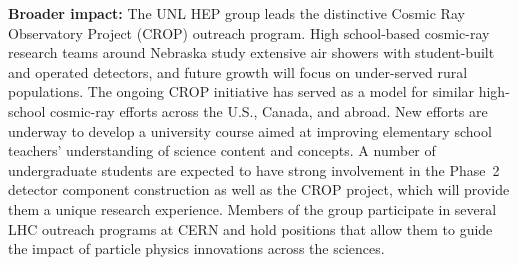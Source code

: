 \documentclass[11pt]{article}
\begin{document}
{\bf Broader impact:}
The UNL HEP group leads the distinctive Cosmic Ray
Observatory Project (CROP) outreach program.  High school-based cosmic-ray research teams around Nebraska study
extensive air showers with student-built and operated detectors, and future growth will focus on under-served rural
populations. The ongoing CROP initiative has served as a model for similar high-school cosmic-ray efforts across the U.S., Canada, and abroad. New efforts are underway to develop a university course aimed at improving elementary school teachers' understanding of science content and concepts.  A number of undergraduate students are expected to have strong involvement in the Phase~2 detector component construction as well as the CROP project, which will provide them a unique research experience.  Members of the group participate in several LHC outreach programs at CERN and hold positions that allow them to guide the impact of particle physics innovations across the sciences.
\end{document}
